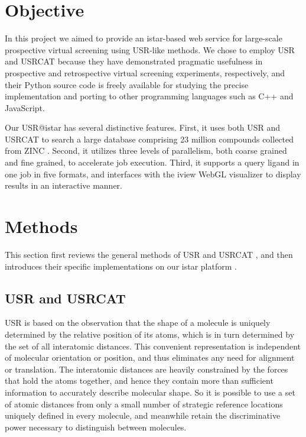 \section{Objective}

In this project we aimed to provide an istar-based \citep{1362} web service for large-scale prospective virtual screening using USR-like methods. We chose to employ USR \citep{1379} and USRCAT \citep{1331} because they have demonstrated pragmatic usefulness in prospective \citep{1380,1281,1504,1502,1615} and retrospective \citep{1331} virtual screening experiments, respectively, and their Python source code is freely available for studying the precise implementation and porting to other programming languages such as C++ and JavaScript.

Our USR@istar has several distinctive features. First, it uses both USR and USRCAT to search a large database comprising 23 million compounds collected from ZINC \citep{532,1178}. Second, it utilizes three levels of parallelism, both coarse grained and fine grained, to accelerate job execution. Third, it supports a query ligand in one job in five formats, and interfaces with the iview \citep{1366} WebGL visualizer to display results in an interactive manner.

\section{Methods}

This section first reviews the general methods of USR \citep{1379} and USRCAT \citep{1331}, and then introduces their specific implementations on our istar platform \citep{1362}.

\subsection{USR and USRCAT}

USR is based on the observation that the shape of a molecule is uniquely determined by the relative position of its atoms, which is in turn determined by the set of all interatomic distances. This convenient representation is independent of molecular orientation or position, and thus eliminates any need for alignment or translation. The interatomic distances are heavily constrained by the forces that hold the atoms together, and hence they contain more than sufficient information to accurately describe molecular shape. So it is possible to use a set of atomic distances from only a small number of strategic reference locations uniquely defined in every molecule, and meanwhile retain the discriminative power necessary to distinguish between molecules.

